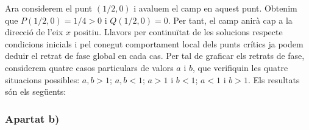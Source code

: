 \documentclass{article}
\begin{document}
Ara considerem el punt $(1/2,0)$ i avaluem el camp en aquest punt. Obtenim que $P(1/2,0)=1/4>0$ i $Q(1/2,0)=0$. Per tant, el camp anirà cap a la direcció de l'eix $x$ positiu. Llavors per continuïtat de les solucions respecte condicions inicials i pel conegut comportament local dels punts crítics ja podem deduir el retrat de fase global en cada cas. Per tal de graficar els retrats de fase, considerem quatre casos particulars de valors $a$ i $b$, que verifiquin les quatre situacions possibles: $a, b>1$; $a,b<1$; $a>1$ i $b<1$; $a<1$ i $b>1$. Els resultats són els següents:
\begin{center}
  \begin{minipage}{0.47\linewidth}
    \centering
    
  \end{minipage}\hfill
  \begin{minipage}{0.47\linewidth}
    \centering
    
  \end{minipage}\vspace{0.02\linewidth}
  \begin{minipage}{0.47\linewidth}
    \centering
    
  \end{minipage}\hfill
  \begin{minipage}{0.47\linewidth}
    \centering
    
  \end{minipage}
\end{center}

\subsubsection*{Apartat b)}
\end{document}
